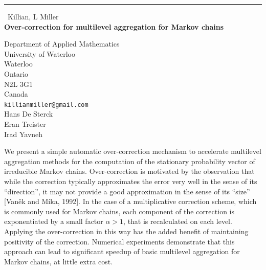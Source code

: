 \documentclass{report}
\begin{document}
\begin{center}
\rule{6in}{1pt} \
{\large Killian, L Miller \\
{\bf Over-correction for multilevel aggregation for Markov chains}}

Department of Applied Mathematics \\ University of Waterloo \\ Waterloo \\ Ontario \\ N2L 3G1 \\ Canada
\\
{\tt killianmiller@gmail.com}\\
Hans De Sterck\\
Eran Treister\\
Irad Yavneh\end{center}

We present a simple automatic over-correction
mechanism to accelerate multilevel aggregation methods for
the computation of the stationary probability vector of irreducible
Markov chains. Over-correction is motivated by the observation
that while the correction typically approximates the error
very well in the sense of its ``direction'', it may not provide
a good approximation in the sense of its ``size'' [Van\v{e}k and
M\'{i}ka, 1992]. In the case of a multiplicative correction scheme,
which is commonly used for Markov chains, each component of the
correction is exponentiated by a small factor $\alpha > 1$, that is
recalculated on each level. Applying the over-correction in this way has
the added benefit of maintaining positivity of the correction. Numerical
experiments demonstrate that this
approach can lead to significant speedup of basic multilevel
aggregation for Markov chains, at little extra cost.
\end{document}
